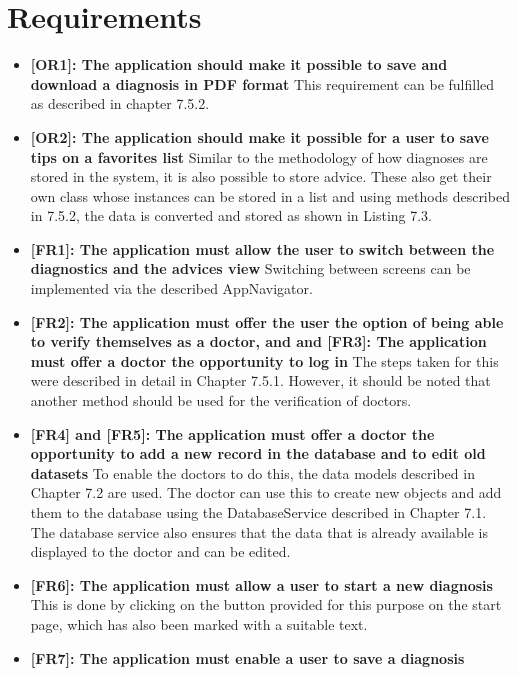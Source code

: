 \section{Requirements}
\begin{itemize}
	\item \textbf{[OR1]: The application should make it possible to save and download a diagnosis in PDF format}
	\newline
	This requirement can be fulfilled as described in chapter 7.5.2.
	\item \textbf{[OR2]: The application should make it possible for a user to save tips on a favorites list}
	\newline
	Similar to the methodology of how diagnoses are stored in the system, it is also possible to store advice. These also get their own class whose instances can be stored in a list and using methods described in 7.5.2, the data is converted and stored as shown in Listing 7.3.
	\item \textbf{[FR1]: The application must allow the user to switch between the diagnostics and the advices view}
	\newline
	Switching between screens can be implemented via the described AppNavigator. 
	\item \textbf{[FR2]: The application must offer the user the option of being able to verify themselves as a doctor, and  and [FR3]: The application must offer a doctor the opportunity to log in}
	\newline
	The steps taken for this were described in detail in Chapter 7.5.1. However, it should be noted that another method should be used for the verification of doctors.
	\item \textbf{[FR4] and [FR5]: The application must offer a doctor the opportunity to add a new record in the database and to edit old datasets}
	\newline
	To enable the doctors to do this, the data models described in Chapter 7.2 are used. The doctor can use this to create new objects and add them to the database using the DatabaseService described in Chapter 7.1. The database service also ensures that the data that is already available is displayed to the doctor and can be edited.
	\item \textbf{[FR6]: The application must allow a user to start a new diagnosis}
	\newline
	This is done by clicking on the button provided for this purpose on the start page, which has also been marked with a suitable text.
	\item \textbf{[FR7]: The application must enable a user to save a diagnosis}

\end{itemize}
